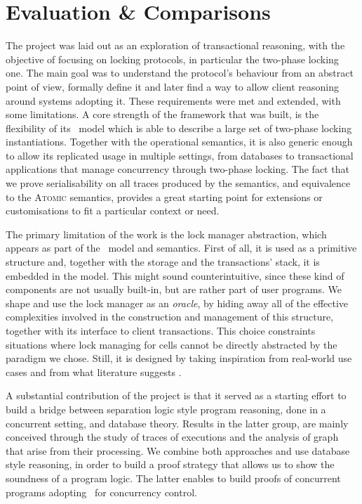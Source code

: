 \section{Evaluation \& Comparisons}

The project was laid out as an exploration of transactional reasoning, with the objective of focusing on locking protocols, in particular the two-phase locking one. The main goal was to understand the protocol's behaviour from an abstract point of view, formally define it and later find a way to allow client reasoning around systems adopting it. These requirements were met and extended, with some limitations. A core strength of the framework that was built, is the flexibility of its \tpl\ model which is able to describe a large set of two-phase locking instantiations. Together with the operational semantics, it is also generic enough to allow its replicated usage in multiple settings, from databases to transactional applications that manage concurrency through two-phase locking. The fact that we prove serialisability on all traces produced by the semantics, and equivalence to the \textsc{Atomic} semantics, provides a great starting point for extensions or customisations to fit a particular context or need.

The primary limitation of the work is the lock manager abstraction, which appears as part of the \tpl\ model and semantics. First of all, it is used as a primitive structure and, together with the storage and the transactions' stack, it is embedded in the model. This might sound counterintuitive, since these kind of components are not usually built-in, but are rather part of user programs. We shape and use the lock manager as an \textit{oracle}, by hiding away all of the effective complexities involved in the construction and management of this structure, together with its interface to client transactions. This choice constraints situations where lock managing for cells cannot be directly abstracted by the paradigm we chose. Still, it is designed by taking inspiration from real-world use cases and from what literature suggests \cite{ccontrol}.

A substantial contribution of the project is that it served as a starting effort to build a bridge between separation logic style program reasoning, done in a concurrent setting, and database theory. Results in the latter group, are mainly conceived through the study of traces of executions and the analysis of graph that arise from their processing. We combine both approaches and use database style reasoning, in order to build a proof strategy that allows us to show the soundness of a program logic. The latter enables to build proofs of concurrent programs adopting \tpl\ for concurrency control.


